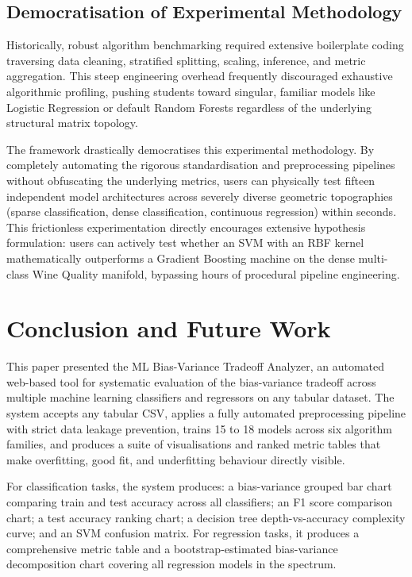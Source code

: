 \documentclass[conference]{IEEEtran}
\begin{document}
\subsection{Democratisation of Experimental Methodology}

Historically, robust algorithm benchmarking required extensive boilerplate coding traversing data cleaning, stratified splitting, scaling, inference, and metric aggregation. This steep engineering overhead frequently discouraged exhaustive algorithmic profiling, pushing students toward singular, familiar models like Logistic Regression or default Random Forests regardless of the underlying structural matrix topology.

The framework drastically democratises this experimental methodology. By completely automating the rigorous standardisation and preprocessing pipelines without obfuscating the underlying metrics, users can physically test fifteen independent model architectures across severely diverse geometric topographies (sparse classification, dense classification, continuous regression) within seconds. This frictionless experimentation directly encourages extensive hypothesis formulation: users can actively test whether an SVM with an RBF kernel mathematically outperforms a Gradient Boosting machine on the dense multi-class Wine Quality manifold, bypassing hours of procedural pipeline engineering.

\section{Conclusion and Future Work}

This paper presented the ML Bias-Variance Tradeoff Analyzer, an automated web-based tool for systematic evaluation of the bias-variance tradeoff across multiple machine learning classifiers and regressors on any tabular dataset. The system accepts any tabular CSV, applies a fully automated preprocessing pipeline with strict data leakage prevention, trains 15 to 18 models across six algorithm families, and produces a suite of visualisations and ranked metric tables that make overfitting, good fit, and underfitting behaviour directly visible.

For classification tasks, the system produces: a bias-variance grouped bar chart comparing train and test accuracy across all classifiers; an F1 score comparison chart; a test accuracy ranking chart; a decision tree depth-vs-accuracy complexity curve; and an SVM confusion matrix. For regression tasks, it produces a comprehensive metric table and a bootstrap-estimated bias-variance decomposition chart covering all regression models in the spectrum.
\end{document}

